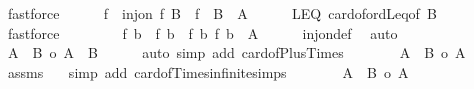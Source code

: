 \begin{isabellebody}
\ fastforce\isanewline
\ \ \ \ \isamarkupfalse%
\ f\ \ {\isachardoublequoteopen}inj{\isacharunderscore}{\kern0pt}on\ f\ B\ {\isasymand}\ f\ {\isacharbackquote}{\kern0pt}\ B\ {\isasymle}\ A{\isachardoublequoteclose}\isanewline
\ \ \ \ \isamarkupfalse%
\ LEQ\ card{\isacharunderscore}{\kern0pt}of{\isacharunderscore}{\kern0pt}ordLeq{\isacharbrackleft}{\kern0pt}of\ B{\isacharbrackright}{\kern0pt}\ \isamarkupfalse%
\ fastforce\isanewline
\ \ \ \ \isamarkupfalse%
\ {}\ \isamarkupfalse%
\ {\isachardoublequoteopen}f\ b{}\ {\isasymnoteq}\ f\ b{}\ {\isasymand}\ {\isacharbraceleft}{\kern0pt}f\ b{}{\isacharcomma}{\kern0pt}\ f\ b{}{\isacharbraceright}{\kern0pt}\ {\isasymle}\ A{\isachardoublequoteclose}\isanewline
\ \ \ \ \isamarkupfalse%
\ inj{\isacharunderscore}{\kern0pt}on{\isacharunderscore}{\kern0pt}def\ \isamarkupfalse%
\ auto\isanewline
\ \ \ \ \isamarkupfalse%
\ {}\ \isamarkupfalse%
\ {\isachardoublequoteopen}{\isacharbar}{\kern0pt}A\ {\isacharless}{\kern0pt}{\isacharplus}{\kern0pt}{\isachargreater}{\kern0pt}\ B{\isacharbar}{\kern0pt}\ {\isasymle}o\ {\isacharbar}{\kern0pt}A\ {\isasymtimes}\ B{\isacharbar}{\kern0pt}{\isachardoublequoteclose}\isanewline
\ \ \ \ \isamarkupfalse%
\ {\isacharparenleft}{\kern0pt}auto\ simp\ add{\isacharcolon}{\kern0pt}\ card{\isacharunderscore}{\kern0pt}of{\isacharunderscore}{\kern0pt}Plus{\isacharunderscore}{\kern0pt}Times{\isacharparenright}{\kern0pt}\isanewline
\ \ \ \ \isamarkupfalse%
\ \isamarkupfalse%
\ {\isachardoublequoteopen}{\isacharbar}{\kern0pt}A\ {\isasymtimes}\ B{\isacharbar}{\kern0pt}\ {\isacharequal}{\kern0pt}o\ {\isacharbar}{\kern0pt}A{\isacharbar}{\kern0pt}{\isachardoublequoteclose}\isanewline
\ \ \ \ \isamarkupfalse%
\ assms\ {\isacharasterisk}{\kern0pt}\ \isamarkupfalse%
\ {\isacharparenleft}{\kern0pt}simp\ add{\isacharcolon}{\kern0pt}\ card{\isacharunderscore}{\kern0pt}of{\isacharunderscore}{\kern0pt}Times{\isacharunderscore}{\kern0pt}infinite{\isacharunderscore}{\kern0pt}simps{\isacharparenright}{\kern0pt}\isanewline
\ \ \ \ \isamarkupfalse%
\ \isamarkupfalse%
\ {\isachardoublequoteopen}{\isacharbar}{\kern0pt}A\ {\isacharless}{\kern0pt}{\isacharplus}{\kern0pt}{\isachargreater}{\kern0pt}\ B{\isacharbar}{\kern0pt}\ {\isasymle}o\ {\isacharbar}{\kern0pt}A{\isacharbar}{\kern0pt}{\isachardoublequoteclose}\ \isamarkupfalse%

\end{isabellebody}
